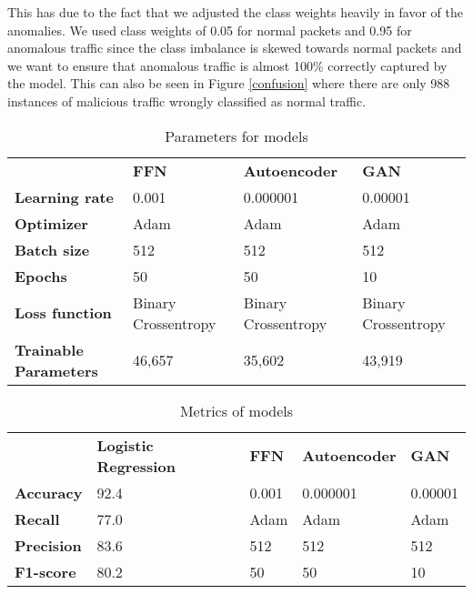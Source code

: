 \documentclass[]{article}
\begin{document}
	This has due to the fact that we adjusted the class weights heavily in favor of the anomalies. We used class weights of 0.05 for normal packets and 0.95 for anomalous traffic since the class imbalance is skewed towards normal packets and we want to ensure that anomalous traffic is almost 100\% correctly captured by the model. This can also be seen in Figure \ref{confusion} where there are only 988 instances of malicious traffic wrongly classified as normal traffic. 
	
	\begin{table}[]
		\begin{tabular}{llll}
			& \textbf{FFN}        & \textbf{Autoencoder} & \textbf{GAN}        \\
			\textbf{Learning rate} & 0.001               & 0.000001             & 0.00001             \\
			\textbf{Optimizer}     & Adam                & Adam                 & Adam                \\
			\textbf{Batch size}    & 512                 & 512                  & 512                 \\
			\textbf{Epochs}        & 50                  & 50                   & 10                  \\
			\textbf{Loss function} & Binary Crossentropy & Binary Crossentropy  & Binary Crossentropy \\
			\textbf{Trainable Parameters} & 46,657 &  35,602 & 43,919 \\
		\end{tabular}
	\caption{Parameters for models}
	\label{table1}
	\end{table}
	
	\begin{table}[]
		\begin{tabular}{lllll}
			& \textbf{Logistic Regression} & \textbf{FFN} & \textbf{Autoencoder} & \textbf{GAN} \\
			\textbf{Accuracy}  & 92.4                       & 0.001        & 0.000001             & 0.00001      \\
			\textbf{Recall}    & 77.0                         & Adam         & Adam                 & Adam         \\
			\textbf{Precision} & 83.6                         & 512          & 512                  & 512          \\
			\textbf{F1-score}  & 80.2                         & 50           & 50                   & 10          
		\end{tabular}
	\caption{Metrics of models}
	\label{table2}
	\end{table}
	
\end{document}
